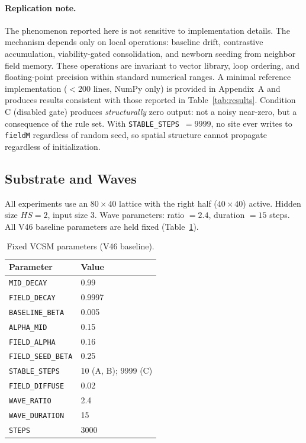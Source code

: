 \documentclass[11pt,twocolumn]{article}
\begin{document}
\paragraph{Replication note.}
The phenomenon reported here is not sensitive to implementation details.
The mechanism depends only on local operations: baseline drift, contrastive
accumulation, viability-gated consolidation, and newborn seeding from neighbor
field memory. These operations are invariant to vector library, loop ordering,
and floating-point precision within standard numerical ranges.
A minimal reference implementation ($<$200 lines, NumPy only) is provided in
Appendix~A and produces results consistent with those reported in
Table~\ref{tab:results}.
Condition C (disabled gate) produces \emph{structurally} zero output:
not a noisy near-zero, but a consequence of the rule set.
With \texttt{STABLE\_STEPS}~$= 9999$, no site ever writes to
\texttt{fieldM} regardless of random seed, so spatial structure
cannot propagate regardless of initialization.

\subsection{Substrate and Waves}

All experiments use an $80 \times 40$ lattice with the right half ($40 \times 40$)
active. Hidden size $HS = 2$, input size 3. Wave parameters: ratio $= 2.4$,
duration $= 15$ steps. All V46 baseline parameters are held fixed
(Table~\ref{tab:params}).

\begin{table}[h]
\centering
\caption{Fixed VCSM parameters (V46 baseline).}
\label{tab:params}
\begin{tabular}{ll}
\toprule
Parameter & Value \\
\midrule
\texttt{MID\_DECAY}         & 0.99   \\
\texttt{FIELD\_DECAY}       & 0.9997 \\
\texttt{BASELINE\_BETA}     & 0.005  \\
\texttt{ALPHA\_MID}         & 0.15   \\
\texttt{FIELD\_ALPHA}       & 0.16   \\
\texttt{FIELD\_SEED\_BETA}  & 0.25   \\
\texttt{STABLE\_STEPS}      & 10 (A, B); 9999 (C) \\
\texttt{FIELD\_DIFFUSE}     & 0.02   \\
\texttt{WAVE\_RATIO}        & 2.4    \\
\texttt{WAVE\_DURATION}     & 15     \\
\texttt{STEPS}              & 3000   \\
\bottomrule
\end{tabular}
\end{table}
\end{document}
